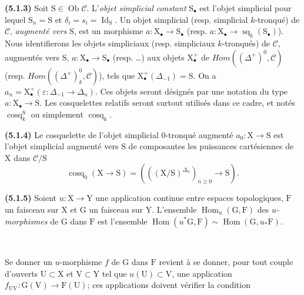 \documentclass[11pt,leqno]{article}
\newcommand{\Page}[1]{\ifvmode\noindent\else\unskip\ \fi{\footnotesize\textcolor{gray}{[p.\,#1]}}\ \ignorespaces}
\begin{document}
\textbf{(5.1.3)} Soit \(\mathrm{S}\in\operatorname{Ob}\mathscr{C}\). L’\textit{objet simplicial constant} \(\mathrm{S}_{\bullet}\) est l’objet simplicial pour lequel \(\mathrm{S}_n=\mathrm{S}\) et \(\delta_i=s_i=\operatorname{Id}_{\mathrm{S}}\). Un objet simplicial (resp. simplicial \(k\)-tronqué) de \(\mathscr{C}\), \textit{augmenté vers} \(\mathrm{S}\), est un morphisme \(a:\mathrm{X}_{\bullet}\to\mathrm{S}_{\bullet}\) (resp. \(a:\mathrm{X}_{\bullet}\to\operatorname{sq}_k(\mathrm{S}_{\bullet})\)). Nous identifierons les objets simpliciaux (resp. simpliciaux \(k\)-tronqués) de \(\mathscr{C}\), augmentés vers \(\mathrm{S}\), \(a:\mathrm{X}_{\bullet}\to\mathrm{S}_{\bullet}\) (resp. …) aux objets \(\mathrm{X}_{\bullet}^{+}\) de \(\mathit{Hom}((\Delta^+)^0,\mathscr{C})\) (resp. \(\mathit{Hom}((\Delta^+)_k^0,\mathscr{C})\)), tels que \(\mathrm{X}_{\bullet}^{+}(\Delta_{-1})=\mathrm{S}\). On a \(a_n=\mathrm{X}_{\bullet}^{+}(\varepsilon:\Delta_{-1}\to\Delta_n)\). Ces objets seront désignés par une notation du type \(a:\mathrm{X}_{\bullet}\to\mathrm{S}\). Les cosquelettes relatifs seront surtout utilisés dans ce cadre, et notés \(\operatorname{cosq}_k^{\mathrm{S}}\) ou simplement \(\operatorname{cosq}_k\).

\textbf{(5.1.4)} Le cosquelette de l’objet simplicial 0-tronqué augmenté \(a_0:\mathrm{X}\to\mathrm{S}\) est l’objet simplicial augmenté vers \(\mathrm{S}\) de composantes les puissances cartésiennes de \(\mathrm{X}\) dans \(\mathscr{C}/\mathrm{S}\)
\[
\operatorname{cosq}_0(\mathrm{X}\to\mathrm{S})
=(((\mathrm{X}/\mathrm{S})^{\Delta_n})_{n\geq0}\to\mathrm{S}).
\]

\textbf{(5.1.5)} Soient \(u:\mathrm{X}\to\mathrm{Y}\) une application continue entre espaces topologiques, \(\mathrm{F}\) un faisceau sur \(\mathrm{X}\) et \(\mathrm{G}\) un faisceau sur \(\mathrm{Y}\). L’ensemble \(\operatorname{Hom}_u(\mathrm{G},\mathrm{F})\) des \textit{\(u\)-morphismes} de \(\mathrm{G}\) dans \(\mathrm{F}\) est l’ensemble \(\operatorname{Hom}(u^*\mathrm{G},\mathrm{F})\sim\operatorname{Hom}(\mathrm{G},u_*\mathrm{F})\).

\Page{10}

Se donner un \(u\)-morphisme \(f\) de \(\mathrm{G}\) dans \(\mathrm{F}\) revient à se donner, pour tout couple d’ouverts \(\mathrm{U}\subset\mathrm{X}\) et \(\mathrm{V}\subset\mathrm{Y}\) tel que \(u(\mathrm{U})\subset\mathrm{V}\), une application \(f_{\mathrm{UV}}:\mathrm{G}(\mathrm{V})\to\mathrm{F}(\mathrm{U})\); ces applications doivent vérifier la condition
\end{document}

